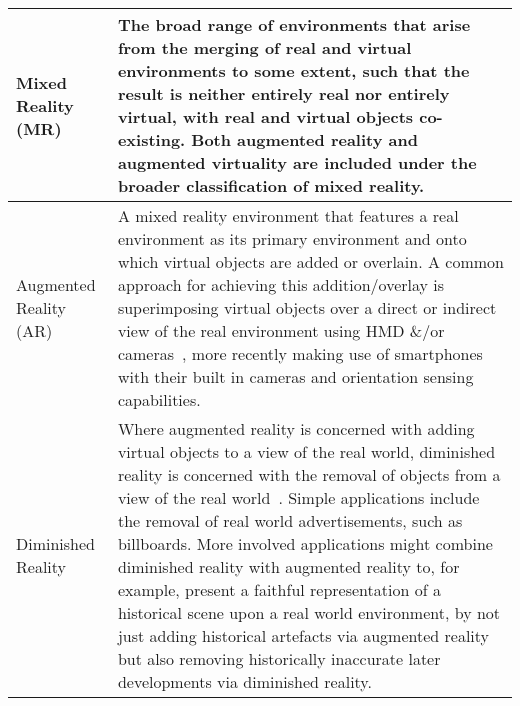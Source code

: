 \begin{center}
\begin{longtable}{ l p{10cm} }

Mixed Reality (MR) & The broad range of environments that arise from the merging of real and virtual environments to some extent, such that the result is neither entirely real nor entirely virtual, with real and virtual objects co-existing. Both augmented reality and augmented virtuality are included under the broader classification of mixed reality. \\

\hline
		

Augmented Reality (AR) & A mixed reality environment that features a real environment as its primary environment and onto which virtual objects are added or overlain. A common approach for achieving this addition/overlay is superimposing virtual objects over a direct or indirect view of the real environment using HMD \&/or cameras~\cite{Krevelen2010}, more recently making use of smartphones with their built in cameras and orientation sensing capabilities. \\



\midrule


Diminished Reality & Where augmented reality is concerned with adding virtual objects to a view of the real world, diminished reality is concerned with the removal of objects from a view of the real world~\cite{Mann2002}. Simple applications include the removal of real world advertisements, such as billboards. More involved applications might combine diminished reality with augmented reality to, for example, present a faithful representation of a historical scene upon a real world environment, by not just adding historical artefacts via augmented reality but also removing historically inaccurate later developments via diminished reality. \\


\end{longtable}
\end{center}

